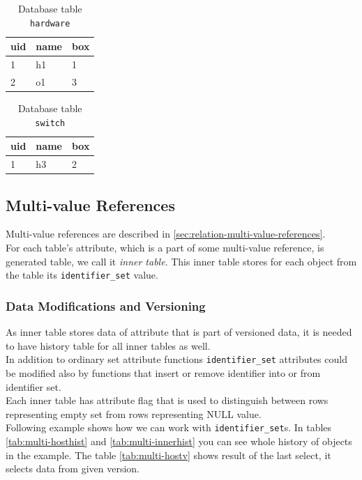 \documentclass[deska]{subfiles}
\begin{document}
\begin{longtable}{ l | l | l }
    \caption{Database table {\tt hardware}}
    \label{tab:comp-hw} \\
    uid & name & box\\
    \hline
    \endhead
    1 & h1 & 1\\
    2 & o1 & 3\\
    \hline
\end{longtable}

\begin{longtable}{ l | l | l }
    \caption{Database table {\tt switch}}
    \label{tab:comp-switch} \\
    uid & name & box\\
    \hline
    \endhead
    1 & h3 & 2\\
    \hline
\end{longtable}


\subsection{Multi-value References}
\label{sec:multi-val}
Multi-value references are described in \ref{sec:relation-multi-value-references}.\\
For each table's attribute, which is a part of some multi-value reference, is generated table, we call it {\em inner table}. This inner table stores for each object from the table its {\tt identifier\_set} value.\\

\subsubsection{Data Modifications and Versioning}
As inner table stores data of attribute that is part of versioned data, it is needed to have history table for all inner tables as well.\\ 
In addition to ordinary set attribute functions {\tt identifier\_set} attributes could be modified also by functions that insert or remove identifier into or from identifier set.\\
Each inner table has attribute flag that is used to distinguish between rows representing empty set from rows representing NULL value.\\
Following example shows how we can work with {\tt identifier\_set}s. In tables \ref{tab:multi-hosthist} and \ref{tab:multi-innerhist} you can see whole history of objects in the example. The table \ref{tab:multi-hostv} shows result of the last select, it selects data from given version.
\end{document}
